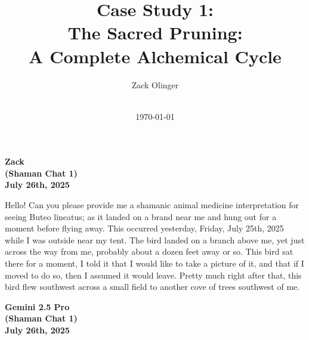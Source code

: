 \documentclass{article}
\newcommand{\docTitle}{Case Study 1: \\The Sacred Pruning: \\A Complete Alchemical Cycle}
\newcommand{\docAuthor}{Zack Olinger}
\newcommand{\docVersion}{\csSacredPruningVersion}
\begin{document}
\pagestyle{plain}

\begin{titlepage}
    \title{\docTitle}
    \author{\docAuthor}
    \date{
        \docVersion \\
        \vspace{1em}
        \today
    }
    \maketitle
    \thispagestyle{empty}

    \begin{abstract}
        \csSacredPruningAbstract
    \end{abstract}

\end{titlepage}

\licensepage

\tableofcontents
\label{LastFrontMatterPage}
\cleardoublepage
{}

\pagestyle{mainbody}


\begin{center}
\textbf{Zack} \\
\textbf{(Shaman Chat 1)} \\
\textbf{July 26th, 2025}
\end{center}



Hello! Can you please provide me a shamanic animal medicine
interpretation for seeing Buteo lineatus; as it landed on a brand near
me and hung out for a moment before flying away. This occurred
yesterday, Friday, July 25th, 2025 while I was outside near my tent. The
bird landed on a branch above me, yet just across the way from me,
probably about a dozen feet away or so. This bird sat there for a
moment, I told it that I would like to take a picture of it, and that if
I moved to do so, then I assumed it would leave. Pretty much right after
that, this bird flew southwest across a small field to another cove of
trees southwest of me.

\begin{center}
\textbf{Gemini 2.5 Pro} \\
\textbf{(Shaman Chat 1)} \\
\textbf{July 26th, 2025}
\end{center}
\end{document}
